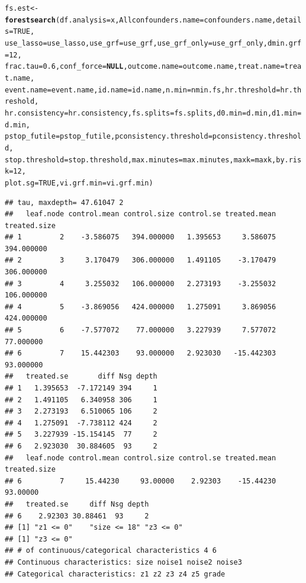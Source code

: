\documentclass[smallextended]{svjour3}
\makeatletter
\newcommand{\hlnum}[1]{\textcolor[rgb]{0.686,0.059,0.569}{#1}}%
\newcommand{\hlstd}[1]{\textcolor[rgb]{0.345,0.345,0.345}{#1}}%
\newcommand{\hlkwa}[1]{\textcolor[rgb]{0.161,0.373,0.58}{\textbf{#1}}}%
\newcommand{\hlkwb}[1]{\textcolor[rgb]{0.69,0.353,0.396}{#1}}%
\newcommand{\hlkwc}[1]{\textcolor[rgb]{0.333,0.667,0.333}{#1}}%
\newcommand{\hlkwd}[1]{\textcolor[rgb]{0.737,0.353,0.396}{\textbf{#1}}}%
\newenvironment{kframe}{%
 \def\at@end@of@kframe{}%
 \ifinner\ifhmode%
  \def\at@end@of@kframe{\end{minipage}}%
  \begin{minipage}{\columnwidth}%
 \fi\fi%
 \def\FrameCommand##1{\hskip\@totalleftmargin \hskip-\fboxsep
 \colorbox{shadecolor}{##1}\hskip-\fboxsep
     \hskip-\linewidth \hskip-\@totalleftmargin \hskip\columnwidth}%
 \MakeFramed {\advance\hsize-\width
   \@totalleftmargin\z@ \linewidth\hsize
   \@setminipage}}%
 {\par\unskip\endMakeFramed%
 \at@end@of@kframe}
\newenvironment{knitrout}{}{} %
\makeatother
\begin{document}
\begin{knitrout}
\begin{kframe}
\begin{alltt}
\hlstd{fs.est} \hlkwb{<-} \hlkwd{forestsearch}\hlstd{(}\hlkwc{df.analysis} \hlstd{= x,} \hlkwc{Allconfounders.name} \hlstd{= confounders.name,} \hlkwc{details} \hlstd{=} \hlnum{TRUE}\hlstd{,}
    \hlkwc{use_lasso} \hlstd{= use_lasso,} \hlkwc{use_grf} \hlstd{= use_grf,} \hlkwc{use_grf_only} \hlstd{= use_grf_only,} \hlkwc{dmin.grf} \hlstd{=} \hlnum{12}\hlstd{,}
    \hlkwc{frac.tau} \hlstd{=} \hlnum{0.6}\hlstd{,} \hlkwc{conf_force} \hlstd{=} \hlkwa{NULL}\hlstd{,} \hlkwc{outcome.name} \hlstd{= outcome.name,} \hlkwc{treat.name} \hlstd{= treat.name,}
    \hlkwc{event.name} \hlstd{= event.name,} \hlkwc{id.name} \hlstd{= id.name,} \hlkwc{n.min} \hlstd{= nmin.fs,} \hlkwc{hr.threshold} \hlstd{= hr.threshold,}
    \hlkwc{hr.consistency} \hlstd{= hr.consistency,} \hlkwc{fs.splits} \hlstd{= fs.splits,} \hlkwc{d0.min} \hlstd{= d.min,} \hlkwc{d1.min} \hlstd{= d.min,}
    \hlkwc{pstop_futile} \hlstd{= pstop_futile,} \hlkwc{pconsistency.threshold} \hlstd{= pconsistency.threshold,}
    \hlkwc{stop.threshold} \hlstd{= stop.threshold,} \hlkwc{max.minutes} \hlstd{= max.minutes,} \hlkwc{maxk} \hlstd{= maxk,} \hlkwc{by.risk} \hlstd{=} \hlnum{12}\hlstd{,}
    \hlkwc{plot.sg} \hlstd{=} \hlnum{TRUE}\hlstd{,} \hlkwc{vi.grf.min} \hlstd{= vi.grf.min)}
\end{alltt}
\begin{verbatim}
## tau, maxdepth= 47.61047 2 
##   leaf.node control.mean control.size control.se treated.mean treated.size
## 1         2    -3.586075   394.000000   1.395653     3.586075   394.000000
## 2         3     3.170479   306.000000   1.491105    -3.170479   306.000000
## 3         4     3.255032   106.000000   2.273193    -3.255032   106.000000
## 4         5    -3.869056   424.000000   1.275091     3.869056   424.000000
## 5         6    -7.577072    77.000000   3.227939     7.577072    77.000000
## 6         7    15.442303    93.000000   2.923030   -15.442303    93.000000
##   treated.se       diff Nsg depth
## 1   1.395653  -7.172149 394     1
## 2   1.491105   6.340958 306     1
## 3   2.273193   6.510065 106     2
## 4   1.275091  -7.738112 424     2
## 5   3.227939 -15.154145  77     2
## 6   2.923030  30.884605  93     2
##   leaf.node control.mean control.size control.se treated.mean treated.size
## 6         7     15.44230     93.00000    2.92303    -15.44230     93.00000
##   treated.se     diff Nsg depth
## 6    2.92303 30.88461  93     2
## [1] "z1 <= 0"    "size <= 18" "z3 <= 0"   
## [1] "z3 <= 0"
## # of continuous/categorical characteristics 4 6 
## Continuous characteristics: size noise1 noise2 noise3 
## Categorical characteristics: z1 z2 z3 z4 z5 grade 

\end{verbatim}
\end{kframe}
\end{knitrout}
\end{document}

